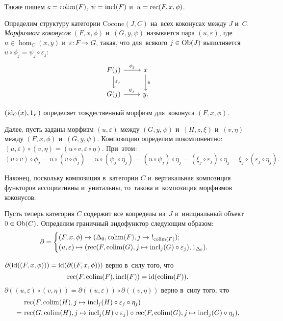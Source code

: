 \documentclass[a4paper,oneside]{article}
\begin{document}
Также пишем $c = \mathrm{colim}(F)$, $\psi = \mathrm{incl}(F)$ и~$u = \mathrm{rec}(F, x, \phi)$.

Определим структуру категории $\mathrm{Cocone}(J, C)$ на~всех коконусах между $J$ и~$C$.
\textit{Морфизмом коконусов} $(F, x, \phi)$ и~$(G, y, \psi)$ называется пара $(u, \varepsilon)$,
где $u \in \hom_C(x, y)$ и~$\varepsilon : F \Rightarrow G$, такая, что для~всякого $j \in \mathrm{Ob}(J)$
выполняется $u \circ \phi_j = \psi_j \circ \varepsilon_j$:
\[
  \begin{tikzcd}
    \arrow{d}{\varepsilon_j} F(j) \arrow{r}{\phi_j} & \arrow{d}{u} x \\
                             G(j) \arrow{r}{\psi_j} &              y.
  \end{tikzcd}
\]

$(\mathrm{id}_C(x), 1_F)$ определяет тождественный морфизм для~коконуса $(F, x, \phi)$.

Далее, пусть заданы морфизм $(u, \varepsilon)$ между $(G, y, \psi)$ и~$(H, z, \xi)$ и~$(v, \eta)$ между $(F, x, \phi)$ и~$(G, y, \psi)$.
Композицию определим покомпонентно: $(u, \varepsilon) \circ (v, \eta) = (u \circ v, \varepsilon \circ \eta)$.
При~этом:
\[
  (u \circ v) \circ \phi_j = u \circ (v \circ \phi_j)
                           = u \circ (\psi_j \circ \eta_j)
                           = (u \circ \psi_j) \circ \eta_j
                           = (\xi_j \circ \varepsilon_j) \circ \eta_j
                           = \xi_j \circ (\varepsilon_j \circ \eta_j).
\]

Наконец, поскольку композиция в~категории $C$ и~вертикальная композиция функторов ассоциативны
и~унитальны, то~такова и~композиция морфизмов коконусов.

Пусть теперь категория $C$ содержит все копределы из~$J$ и~инициальный объект $0 \in \mathrm{Ob}(C)$.
Определим граничный эндофунктор следующим образом:
\[
\partial = \begin{cases}
             (F, x, \phi) \mapsto (\Delta_0, \colim(F), j \mapsto\ !_{\colim(F)}); \\
             (u, \varepsilon) \mapsto (\rec(F, \colim(G), j \mapsto \incl_j(G) \circ \varepsilon_j), 1_{\Delta_0}).
           \end{cases}
\]

$\partial(\mathrm{id}((F, x, \phi))) = \mathrm{id}(\partial((F, x, \phi)))$ верно в~силу того, что
\[
  \mathrm{rec}(F, \mathrm{colim}(F), \mathrm{incl}(F)) = \mathrm{id}(\mathrm{colim}(F)).
\]
$\partial((u, \varepsilon) \circ (v, \eta)) = \partial((u, \varepsilon)) \circ \partial((v, \eta))$
верно в~силу того, что
\[
\begin{aligned}
  \phantom{=}&\ \mathrm{rec}(F, \mathrm{colim}(H), j \mapsto \mathrm{incl}_j(H) \circ \varepsilon_j \circ \eta_j) \\
            =&\ \mathrm{rec}(G, \mathrm{colim}(H), j \mapsto \mathrm{incl}_j(H) \circ \varepsilon_j) \circ \mathrm{rec}(F, \mathrm{colim}(G), j \mapsto \mathrm{incl}_j(G) \circ \eta_j).
\end{aligned}
\]
\end{document}
